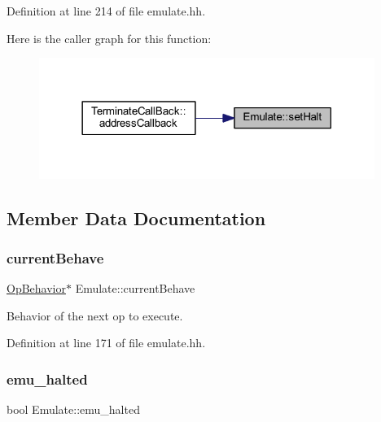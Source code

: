 Definition at line 214 of file emulate.\+hh.

Here is the caller graph for this function\+:
\nopagebreak
\begin{figure}[H]
\begin{center}
\leavevmode
\includegraphics[width=309pt]{class_emulate_a4858bc80cf7b078a592f9c8d3442450d_icgraph}
\end{center}
\end{figure}


\subsection{Member Data Documentation}
\mbox{\label{class_emulate_a1e5d4f8c0ad5c62aa3e723440c5141ca}} 
\subsubsection{\texorpdfstring{currentBehave}{currentBehave}}
{\footnotesize\ttfamily \mbox{\hyperlink{class_op_behavior}{Op\+Behavior}}$\ast$ Emulate\+::current\+Behave\hspace{0.3cm}{\ttfamily [protected]}}



Behavior of the next op to execute. 



Definition at line 171 of file emulate.\+hh.

\mbox{\label{class_emulate_a8811816cbc0eef9f4cdb856cfd496e94}} 
\subsubsection{\texorpdfstring{emu\_halted}{emu\_halted}}
{\footnotesize\ttfamily bool Emulate\+::emu\+\_\+halted\hspace{0.3cm}{\ttfamily [protected]}}



